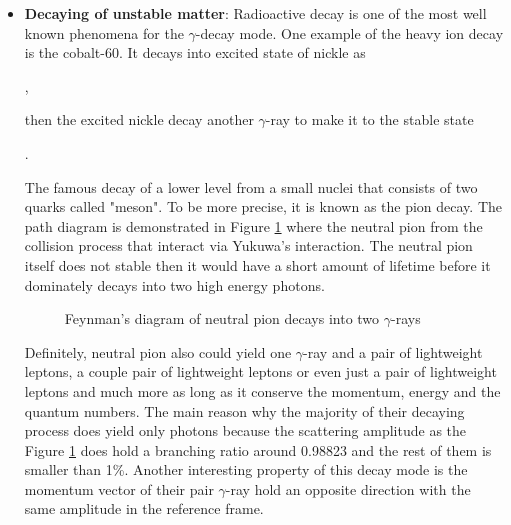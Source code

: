 \begin{itemize}
    \item \textbf{Decaying of unstable matter}:
    Radioactive decay is one of the most well known
    phenomena for the $\gamma$-decay mode. One example 
    of the heavy ion decay is the cobalt-60. It decays 
    into excited state of nickle as

    ,

    then the excited nickle decay another $\gamma$-ray
    to make it to the stable state

    .

    The famous decay of a lower level from a small 
    nuclei that consists of two quarks called "meson".
    To be more precise, it is known as the pion decay.
    The path diagram is demonstrated in Figure \ref{fig:neutral_pion_decay}
    where the neutral pion from the collision process that
    interact via Yukuwa's interaction. The neutral pion itself
    does not stable then it would have a short amount of lifetime 
    before it dominately decays into two high energy photons.
    \begin{figure}[h]
        \centering
        
        \caption{Feynman's diagram of neutral pion decays into two $\gamma$-rays}
        \label{fig:neutral_pion_decay}
    \end{figure}
    Definitely, neutral pion also could yield one $\gamma$-ray
    and a pair of lightweight leptons, a couple 
    pair of lightweight leptons or even just a pair 
    of lightweight leptons and much more as long as it 
    conserve the momentum, energy and the quantum numbers.
    The main reason why the majority of their decaying process
    does yield only photons because the scattering amplitude
    as the Figure \ref{fig:neutral_pion_decay} does hold a branching
    ratio around 0.98823 and the rest of them is 
    smaller than 1\%. Another interesting property of this 
    decay mode is the momentum vector of their pair $\gamma$-ray
    hold an opposite direction with the same amplitude in the 
    reference frame.


\end{itemize}
